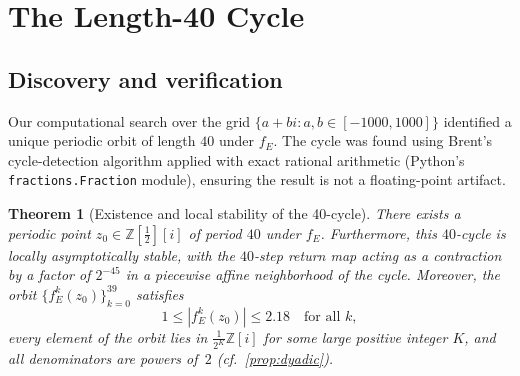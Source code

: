 \documentclass[12pt]{article}
\theoremstyle{plain}
\newtheorem{theorem}{Theorem}[section]
\theoremstyle{definition}
\theoremstyle{remark}
\theoremstyle{definition}
\newcommand{\Z}{\mathbb{Z}}
\newcommand{\norm}[1]{\left|#1\right|}
\begin{document}
\section{The Length-40 Cycle}
\label{sec:40cycle}

\subsection{Discovery and verification}

Our computational search over the grid $\{a+bi : a,b \in [-1000,1000]\}$
identified a unique periodic orbit of length $40$ under $f_E$.
The cycle was found using Brent's cycle-detection algorithm applied
with exact rational arithmetic (Python's \texttt{fractions.Fraction}
module), ensuring the result is not a floating-point artifact.

\begin{theorem}[Existence and local stability of the 40-cycle]
\label{thm:40cycle}
There exists a periodic point $z_0 \in \Z[\tfrac{1}{2}][i]$ of period $40$ under $f_E$.
Furthermore, this $40$-cycle is locally asymptotically stable, with the $40$-step return map acting as a contraction by a factor of $2^{-45}$ in a piecewise affine neighborhood of the cycle.
Moreover, the orbit $\{f_E^k(z_0)\}_{k=0}^{39}$ satisfies
\[
    1 \leq \norm{f_E^k(z_0)} \leq 2.18 \quad \text{for all } k,
\]
every element of the orbit lies in $\tfrac{1}{2^K}\Z[i]$ for
some large positive integer $K$, and all denominators are
powers of~$2$ (cf.\ \cref{prop:dyadic}).
\end{theorem}
\end{document}
